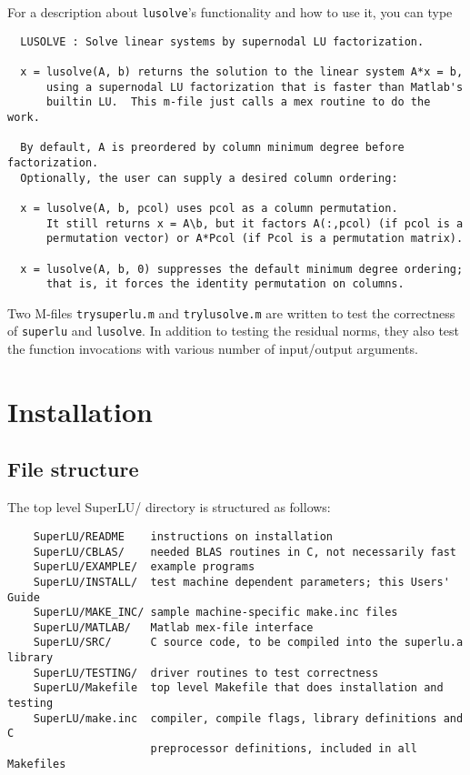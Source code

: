 \noindent For a description about {\tt lusolve}'s functionality and how
to use it, you can type

 \hspace{.4in}{\tt help lusolve}


\begin{verbatim}
  LUSOLVE : Solve linear systems by supernodal LU factorization.
 
  x = lusolve(A, b) returns the solution to the linear system A*x = b,
      using a supernodal LU factorization that is faster than Matlab's 
      builtin LU.  This m-file just calls a mex routine to do the work.

  By default, A is preordered by column minimum degree before factorization.
  Optionally, the user can supply a desired column ordering:

  x = lusolve(A, b, pcol) uses pcol as a column permutation.  
      It still returns x = A\b, but it factors A(:,pcol) (if pcol is a 
      permutation vector) or A*Pcol (if Pcol is a permutation matrix).
       
  x = lusolve(A, b, 0) suppresses the default minimum degree ordering;
      that is, it forces the identity permutation on columns.
\end{verbatim}

Two M-files {\tt trysuperlu.m} and {\tt trylusolve.m} are written to test the 
correctness of {\tt superlu} and {\tt lusolve}. In addition to testing the
residual norms, they also test the function invocations with various
number of input/output arguments.


\section{Installation}
\label{sec:install}
\subsection{File structure}
The top level SuperLU/ directory is structured as follows:
\begin{verbatim}
    SuperLU/README    instructions on installation
    SuperLU/CBLAS/    needed BLAS routines in C, not necessarily fast
    SuperLU/EXAMPLE/  example programs
    SuperLU/INSTALL/  test machine dependent parameters; this Users' Guide
    SuperLU/MAKE_INC/ sample machine-specific make.inc files
    SuperLU/MATLAB/   Matlab mex-file interface
    SuperLU/SRC/      C source code, to be compiled into the superlu.a library
    SuperLU/TESTING/  driver routines to test correctness
    SuperLU/Makefile  top level Makefile that does installation and testing
    SuperLU/make.inc  compiler, compile flags, library definitions and C
                      preprocessor definitions, included in all Makefiles
\end{verbatim}

